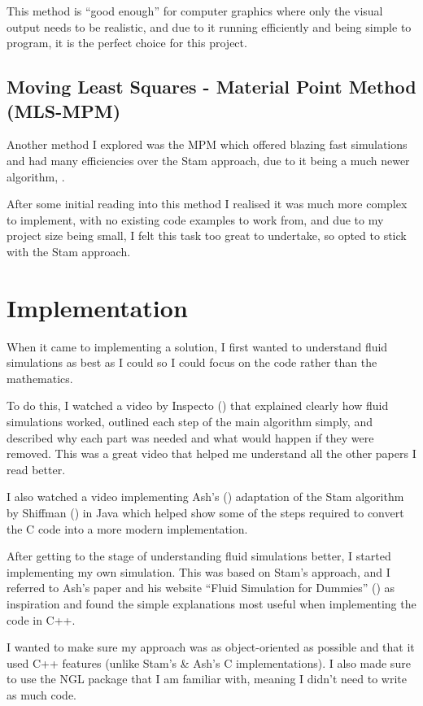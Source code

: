 \documentclass[notitlepage,12pt]{article}
\begin{document}
This method is ``good enough'' for computer graphics where only the visual output needs to be realistic, and due to it running efficiently and being simple to program, it is the perfect choice for this project.

\subsection{Moving Least Squares - Material Point Method (MLS-MPM)}

Another method I explored was the MPM which offered blazing fast simulations and had many efficiencies over the Stam approach, due to it being a much newer algorithm, \cite{mlsmpm}.

After some initial reading into this method I realised it was much more complex to implement, with no existing code examples to work from, and due to my project size being small, I felt this task too great to undertake, so opted to stick with the Stam approach.

\section{Implementation}

When it came to implementing a solution, I first wanted to understand fluid simulations as best as I could so I could focus on the code rather than the mathematics. 

To do this, I watched a video by Inspecto (\cite{inspectoyt}) that explained clearly how fluid simulations worked, outlined each step of the main algorithm simply, and described why each part was needed and what would happen if they were removed. This was a great video that helped me understand all the other papers I read better.

I also watched a video implementing Ash's (\cite{ash2005simulation}) adaptation of the Stam algorithm by Shiffman (\cite{shiffmanyt}) in Java which helped show some of the steps required to convert the C code into a more modern implementation.

After getting to the stage of understanding fluid simulations better, I started implementing my own simulation. This was based on Stam's approach, and I referred to Ash's paper and his website ``Fluid Simulation for Dummies'' (\cite{ashdummies}) as inspiration and found the simple explanations most useful when implementing the code in C++.

I wanted to make sure my approach was as object-oriented as possible and that it used C++ features (unlike Stam's \& Ash's C implementations). I also made sure to use the NGL package that I am familiar with, meaning I didn't need to write as much code. 
\end{document}
